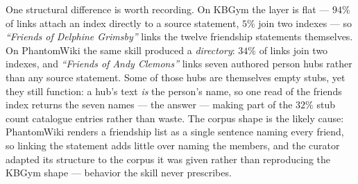 \documentclass[conference]{IEEEtran}
\newcommand{\kbgym}{KBGym}
\begin{document}
One structural difference is worth recording. On \kbgym{} the layer is
flat --- $94\%$ of links attach an index directly to a source statement,
$5\%$ join two indexes --- so \emph{``Friends of Delphine Grimsby''}
links the twelve friendship statements themselves. On PhantomWiki the same
skill produced a \emph{directory}: $34\%$ of links join two indexes, and
\emph{``Friends of Andy Clemons''} links seven authored person hubs
rather than any source statement. Some of those hubs are themselves empty
stubs, yet they still function: a hub's text \emph{is} the person's name,
so one read of the friends index returns the seven names --- the answer
--- making part of the $32\%$ stub count catalogue entries rather than
waste. The corpus shape is the likely cause: PhantomWiki renders a
friendship list as a single sentence naming every friend, so linking the
statement adds little over naming the members, and the curator adapted its
structure to the corpus it was given rather than reproducing the
\kbgym{} shape --- behavior the skill never prescribes.
\end{document}
